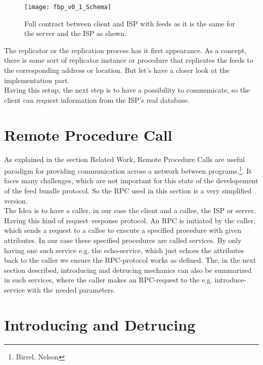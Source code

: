 \begin{figure}
    \centering
    \texttt{[image: fbp\_v0\_1\_Schema]}
    \caption{Full contract between client and ISP with feeds as it is the same for the server and the ISP as shown.}
    \label{fig:contract_cli_isp}
\end{figure}
The replicator or the replication process has it first appearance. As a concept, there is some sort of replicator instance or procedure that replicates the feeds to the corresponding address or location. But let’s have a closer look at the implementation part. \\
Having this setup, the next step is to have a possibility to communicate, so the client can request information from the ISP’s real database.

\pagebreak
\section{Remote Procedure Call}
As explained in the section Related Work, Remote Procedure Calls are useful paradigm for providing communication across a
network between programs.\footnote{Birrel, Nelson}. It faces many challenges, which are not important for this state of the developement of the feed bundle protocol. So the RPC used in this section is a very simplified version.\\
The Idea is to have a caller, in our case the client and a callee, the ISP or server. Having this kind of request–response protocol. An RPC is initiated by the caller, which sends a request to a callee to execute a specified procedure with given attributes. In our case these specified procedures are called services. By only having one such service e.g. the echo-service, which just echoes the attributes back to the caller we ensure the RPC-protocol works as defined. The, in the next section described, introducing and detrucing mechanics can also be summarized in such services, where the caller makes an RPC-request to the e.g. introduce-service with the needed parameters. 

\section{Introducing and Detrucing}
